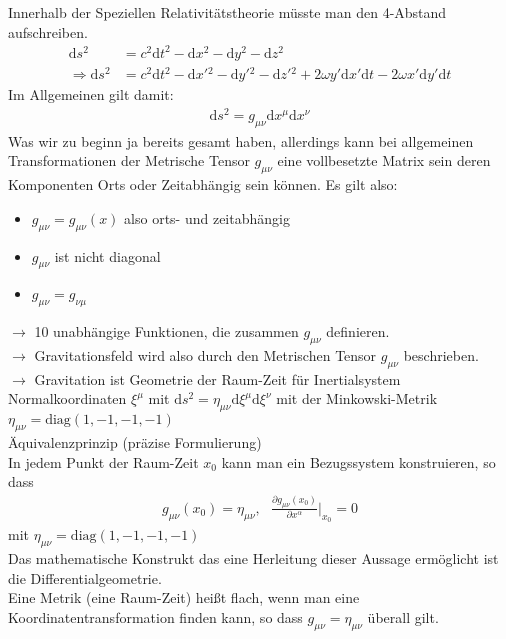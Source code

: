 \documentclass[a4paper]{article}
\begin{document}
Innerhalb der Speziellen Relativitätstheorie müsste man den 4-Abstand
aufschreiben. 
\begin{align}
\mathrm{d}s^2&=c^2\mathrm{d}t^2-\mathrm{d}x^2-\mathrm{d}y^2-\mathrm{d}z^2\\
\Rightarrow
\mathrm{d}s^2&=c^2\mathrm{d}t^2-\mathrm{d}x'{}^2-\mathrm{d}y'{}^2-
\mathrm{d}z'{}^2+2\omega y'\mathrm{d}x'\mathrm{d}t -2\omega x'
\mathrm{d}y'\mathrm{d}t
\end{align}
Im Allgemeinen gilt damit:
\begin{align}
\mathrm{d}s^2=g_{\mu\nu}\mathrm{d}x^\mu\mathrm{d}x^\nu
\end{align}
Was wir zu beginn ja bereits gesamt haben, allerdings kann bei allgemeinen
Transformationen der Metrische Tensor $g_{\mu\nu}$ eine vollbesetzte Matrix sein
deren Komponenten Orts oder Zeitabhängig sein können. Es gilt also:
\begin{itemize}
  \item $g_{\mu\nu}=g_{\mu\nu}(x)$ also orts- und zeitabhängig
  \item $g_{\mu\nu}$ ist nicht diagonal
  \item $g_{\mu\nu}=g_{\nu\mu}$
\end{itemize}
$\rightarrow$ 10 unabhängige Funktionen, die zusammen $g_{\mu\nu}$ definieren.\\
$\rightarrow$ Gravitationsfeld wird also durch den Metrischen Tensor
$g_{\mu\nu}$ beschrieben.\\
$\rightarrow$ Gravitation ist Geometrie der Raum-Zeit
für Inertialsystem\\
Normalkoordinaten $\xi^\mu$ mit $\mathrm{d}s^2=\eta_{\mu\nu}\mathrm{d}
\xi^\mu\mathrm{d}\xi^\nu$ mit der Minkowski-Metrik
$\eta_{\mu\nu}=\text{diag}(1,-1,-1,-1)$\\
Äquivalenzprinzip (präzise Formulierung)\\
In jedem Punkt der Raum-Zeit $x_0$ kann man ein Bezugssystem konstruieren, so
dass
\begin{align}
g_{\mu\nu}(x_0)=\eta_{\mu\nu}, \ \ \ \frac{\partial g_{\mu\nu}(x_0)}{\partial
x^\alpha}\Big|_{x_0}=0
\end{align}
mit $\eta_{\mu\nu}=\text{diag}(1,-1,-1,-1)$\\
Das mathematische Konstrukt das eine Herleitung dieser Aussage ermöglicht ist
die Differentialgeometrie.\\
Eine Metrik (eine Raum-Zeit) heißt flach, wenn man eine Koordinatentransformation
finden kann, so dass $g_{\mu\nu}=\eta_{\mu\nu}$ überall gilt.\\
\end{document}
